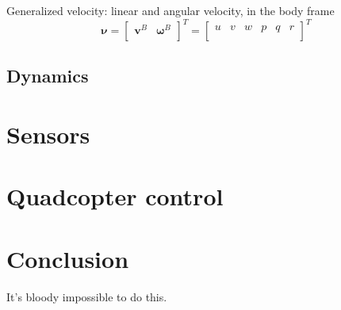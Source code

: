 \documentclass[journal]{IEEEtran}
\begin{document}
	Generalized velocity: linear and angular velocity, in the body frame
	\begin{equation} \label{eq:vel}
		\bm{\nu} = \left[ \begin{array}{cc}
		\bm{v}^B & \bm{\omega}^B \\
		\end{array}\right]^T = \left[ \begin{array}{cccccc}
		u & v & w & p & q & r\\
		\end{array}\right] ^T 
	\end{equation}
	
	
	\subsection{Dynamics}

\section{Sensors}

\section{Quadcopter control}

\section{Conclusion}
It's bloody impossible to do this.




%
\end{document}
